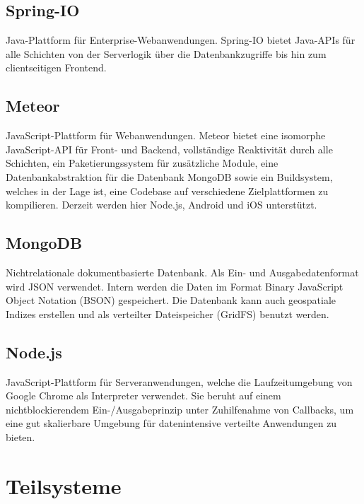 \subsection{Spring-IO}
\label{ch:fachlichesUmfeld:Technologien:Spring}

Java-Plattform für Enterprise-Webanwendungen. Spring-IO bietet Java-APIs für
alle Schichten von der Serverlogik über die Datenbankzugriffe bis hin zum
clientseitigen Frontend.

\subsection{Meteor}
\label{ch:fachlichesUmfeld:Technologien:Meteor}

JavaScript-Plattform für Webanwendungen. Meteor bietet eine isomorphe
JavaScript-API  für Front- und Backend, vollständige Reaktivität durch alle
Schichten, ein Paketierungssystem für zusätzliche Module, eine
Datenbankabstraktion für die Datenbank MongoDB sowie ein Buildsystem, welches in
der Lage ist, eine Codebase auf verschiedene Zielplattformen zu kompilieren.
Derzeit werden hier Node.js, Android und iOS unterstützt.

\subsection{MongoDB}
\label{ch:fachlichesUmfeld:Technologien:MongoDB}

Nichtrelationale dokumentbasierte Datenbank. Als Ein- und Ausgabedatenformat
wird JSON verwendet. Intern werden die Daten im Format Binary JavaScript Object
Notation (BSON) gespeichert. Die Datenbank kann auch geospatiale Indizes
erstellen und als verteilter Dateispeicher (GridFS) benutzt werden.

\subsection{Node.js}
\label{ch:fachlichesUmfeld:Technologien:Node.js}

JavaScript-Plattform für Serveranwendungen, welche die Laufzeitumgebung von
Google Chrome als Interpreter verwendet. Sie beruht auf einem nichtblockierendem
Ein-/Ausgabeprinzip unter Zuhilfenahme von Callbacks, um eine gut skalierbare
Umgebung für datenintensive verteilte Anwendungen zu bieten.

\section{Teilsysteme}
\label{ch:fachlichesUmfeld:Teilsysteme}

